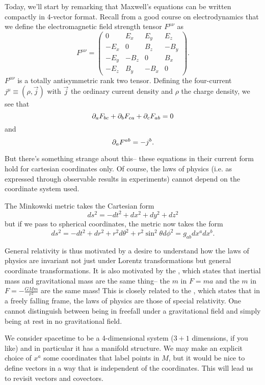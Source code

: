 Today, we'll start by remarking that Maxwell's equations can be written compactly in 4-vector format. Recall from a good course on electrodynamics that we define the electromagnetic field strength tensor $F^{\mu\nu}$ as
$$F^{\mu\nu}=\begin{pmatrix}
0& E_x & E_y & E_z\\
-E_x & 0 & B_z & - B_y\\
-E_y & -B_z & 0 & B_x\\
-E_z & B_y & -B_x & 0
\end{pmatrix}.$$
$F^{\mu\nu}$ is a totally antisymmetric rank two tensor. Defining the four-current $j^\mu \equiv(\rho, \vec{j})$ with $\vec{j}$ the ordinary current density and $\rho$ the charge density, we see that
$$\partial_a F_{bc} +\partial_b F_{ca} +\partial_c F_{ab}=0$$
and
$$\partial_a F^{ab}=-j^b.$$

But there's something strange about this-- these equations in their current form hold for cartesian coordinates only. Of course, the laws of physics (i.e. as expressed through observable results in experiments) cannot depend on the coordinate system used. 
\begin{exm}
The Minkowski metric takes the Cartesian form
$$ds^2=-dt^2+dx^2+dy^2+dz^2$$
but if we pass to spherical coordinates, the metric now takes the form 
$$ds^2=-dt^2+dr^2+r^2d\theta^2 +r^2 \sin^2 \theta d\phi^2=g_{ab}dx^a dx^b.$$
\end{exm}

General relativity is thus motivated by a desire to understand how the laws of physics are invariant not just under Lorentz transformations but general coordinate transformations. It is also motivated by the , which states that inertial mass and gravitational mass are the same thing-- the $m$ in $F=ma$ and the $m$ in $F=-\frac{GMm }{r^2}$ are the same mass! This is closely related to the , which states that in a freely falling frame, the laws of physics are those of special relativity. One cannot distinguish between being in freefall under a gravitational field and simply being at rest in no gravitational field.

We consider spacetime to be a 4-dimensional system ($3+1$ dimensions, if you like) and in particular it has a manifold structure. We may make an explicit choice of $x^a$ some coordinates that label points in $M$, but it would be nice to define vectors in a way that is independent of the coordinates. This will lead us to revisit vectors and covectors.

